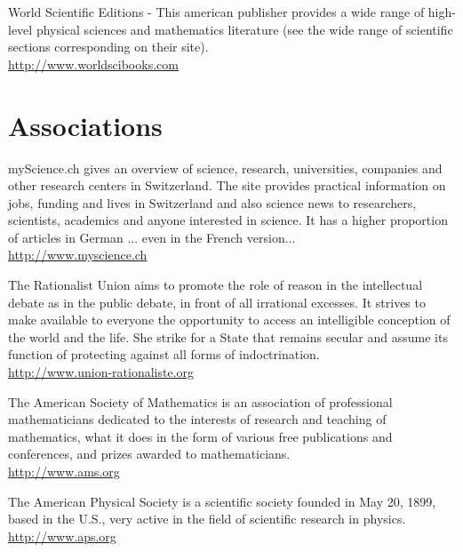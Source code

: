 	{\Large {}}{\Large {}}{\Large {}} World Scientific Editions - This american publisher provides a wide range of high-level physical sciences and mathematics literature (see the wide range of scientific sections corresponding on their site).\\
	\href{http://www.worldscibooks.com}{\color{blue}http://www.worldscibooks.com}
	
	\section{Associations}

		{\Large {}} myScience.ch gives an overview of science, research, universities, companies and other research centers in Switzerland. The site provides practical information on jobs, funding and lives in Switzerland and also science news to researchers, scientists, academics and anyone interested in science. It has a higher proportion of articles in German ... even in the French version...\\
		\href{http://www.myscience.ch}{\color{blue}http://www.myscience.ch}
		
		{\Large {}}{\Large {}}{\Large {}}\bcdfrance{} The Rationalist Union aims to promote the role of reason in the intellectual debate as in the public debate, in front of all irrational excesses. It strives to make available to everyone the opportunity to access an intelligible conception of the world and the life. She strike for a State that remains secular and assume its function of protecting against all forms of indoctrination.\\
		\href{http://www.union-rationaliste.org}{\color{blue}http://www.union-rationaliste.org}
		
		{\Large {}}{\Large {}} The American Society of Mathematics is an association of professional mathematicians dedicated to the interests of research and teaching of mathematics, what it does in the form of various free publications and conferences, and prizes awarded to mathematicians.\\
		\href{http://www.ams.org}{\color{blue}http://www.ams.org}
		
		{\Large {}}{\Large {}} The American Physical Society is a scientific society founded in May 20, 1899, based in the U.S., very active in the field of scientific research in physics.\\
		\href{http://www.aps.org}{\color{blue}http://www.aps.org}
		
